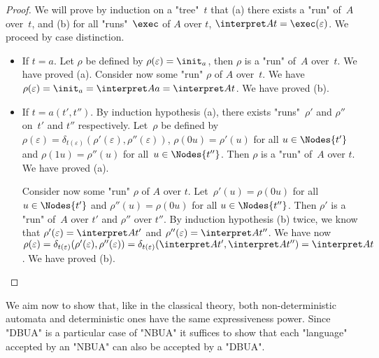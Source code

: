 \documentclass[a4paper,UKenglish,cleveref, autoref, thm-restate]{lipics-v2021}
\begin{document}
\begin{proof}
	We will prove by induction on a "tree"~$t$ that (a) there exists a "run" of~$A$ over~$t$, and (b) for all "runs"~$\exec$ of $A$ over $t$, $\interpret A t = \exec (\varepsilon)$.
	We proceed by case distinction.
	\begin{itemize}
		\item If $t = a$. Let $\rho$ be defined by $\rho(\varepsilon)=\init_a$, then $\rho$ is a "run" of~$A$ over~$t$. We have proved (a).
		      Consider now some "run" $\rho$ of $A$ over~$t$. We have $\rho(\varepsilon)=\init_a=\interpret A a=\interpret A t$. We have proved  (b).

		\item If $t = a(t',t'')$. By induction hypothesis (a), there exists "runs"~$\rho'$ and $\rho''$ on~$t'$ and $t''$ respectively.
		      Let~$\rho$ be defined by $\rho(\varepsilon)=\delta_{t(\varepsilon)}(\rho'(\varepsilon),\rho''(\varepsilon))$,
		      $\rho(0u)=\rho'(u)$ for all $u\in\Nodes{t'}$ and $\rho(1u)=\rho''(u)$ for all~$u\in \Nodes{t''}$. Then $\rho$ is a "run" of~$A$ over $t$. We have proved (a).

		      Consider now some "run" $\rho$ of $A$ over $t$. Let~$\rho'(u)=\rho(0u)$ for all $u \in \Nodes {t'}$ and $\rho''(u)=\rho(0u)$ for all $u \in \Nodes {t''}$.
		      Then $\rho'$ is a "run" of~$A$ over $t'$ and $\rho''$ over $t''$. By induction hypothesis (b) twice, we know that $\rho'(\varepsilon)=\interpret A {t'}$ and $\rho''(\varepsilon)=\interpret A {t''}$.
		      We have now $\rho(\varepsilon) = \delta_{t(\varepsilon)}(\rho'(\varepsilon),\rho''(\varepsilon)) = \delta_{t(\varepsilon)}(\interpret A {t'},\interpret A {t''}) = \interpret A t$. We have proved (b).
	\end{itemize}
\end{proof}


We aim now to show that, like in the classical theory, both non-deterministic automata and deterministic ones have the same expressiveness power.
Since "DBUA" is a particular case of "NBUA" it suffices to show that each "language" accepted by an "NBUA" can also be accepted by a "DBUA".
\end{document}

